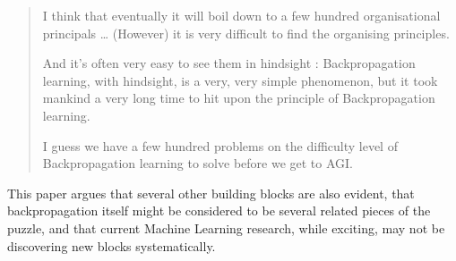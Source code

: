 \documentclass[citeauthoryear]{llncs}
\begin{document}
\begin{quotation}

I think that eventually it will boil down to a few hundred organisational principals
\dots
%
%
%
(However) it is very difficult to find the organising principles.

And it's often very easy to see them in hindsight : 
Backpropagation learning, with hindsight, is a very, very simple phenomenon, 
but it took mankind a very long time to hit upon the principle of Backpropagation learning. 

I guess we have a few hundred problems on the difficulty level of Backpropagation learning to solve before we get to AGI. 


\end{quotation}

This paper argues that several other building blocks are also evident, 
that backpropagation itself might be considered to be several related pieces of the puzzle,
and that current Machine Learning research, while exciting, may not be
discovering new blocks systematically.
\end{document}
